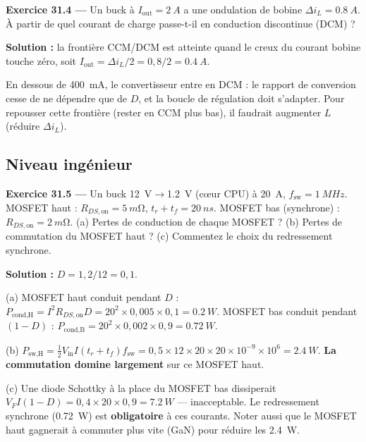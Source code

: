 \documentclass[12pt,a4paper,twoside]{book}
\begin{document}
\textbf{Exercice 31.4 ---} Un buck à $I_{\text{out}} = \SI{2}{A}$ a une ondulation de bobine $\Delta i_L = \SI{0.8}{A}$. À partir de quel courant de charge passe-t-il en conduction discontinue (DCM) ?

\begin{pratique}
\textbf{Solution :} la frontière CCM/DCM est atteinte quand le creux du courant bobine touche zéro, soit $I_{\text{out}} = \Delta i_L/2 = 0{,}8/2 = \SI{0.4}{A}$.

En dessous de \SI{400}{mA}, le convertisseur entre en DCM : le rapport de conversion cesse de ne dépendre que de $D$, et la boucle de régulation doit s'adapter. Pour repousser cette frontière (rester en CCM plus bas), il faudrait augmenter $L$ (réduire $\Delta i_L$).
\end{pratique}

\subsection*{Niveau ingénieur}

\textbf{Exercice 31.5 ---} Un buck \SI{12}{V}$\to$\SI{1.2}{V} (cœur CPU) à \SI{20}{A}, $f_{\text{sw}} = \SI{1}{MHz}$. MOSFET haut : $R_{DS,\text{on}} = \SI{5}{m\ohm}$, $t_r + t_f = \SI{20}{ns}$. MOSFET bas (synchrone) : $R_{DS,\text{on}} = \SI{2}{m\ohm}$. (a) Pertes de conduction de chaque MOSFET ? (b) Pertes de commutation du MOSFET haut ? (c) Commentez le choix du redressement synchrone.

\begin{pratique}
\textbf{Solution :} $D = 1{,}2/12 = 0{,}1$.

(a) MOSFET haut conduit pendant $D$ : $P_{\text{cond,H}} = I^2 R_{DS,\text{on}} D = 20^2\times0{,}005\times0{,}1 = \SI{0.2}{W}$. MOSFET bas conduit pendant $(1-D)$ : $P_{\text{cond,B}} = 20^2\times0{,}002\times0{,}9 = \SI{0.72}{W}$.

(b) $P_{\text{sw,H}} = \frac{1}{2}V_{\text{in}}I(t_r+t_f)f_{\text{sw}} = 0{,}5\times12\times20\times20\times10^{-9}\times10^6 = \SI{2.4}{W}$. \textbf{La commutation domine largement} sur ce MOSFET haut.

(c) Une diode Schottky à la place du MOSFET bas dissiperait $V_F I (1-D) = 0{,}4\times20\times0{,}9 = \SI{7.2}{W}$ --- inacceptable. Le redressement synchrone (\SI{0.72}{W}) est \textbf{obligatoire} à ces courants. Noter aussi que le MOSFET haut gagnerait à commuter plus vite (GaN) pour réduire les \SI{2.4}{W}.
\end{pratique}
\end{document}
